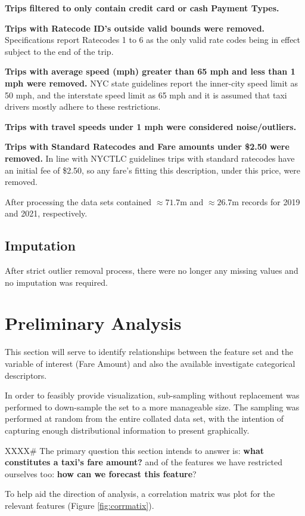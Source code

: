 \documentclass[11pt]{article}
\begin{document}
\textbf{Trips filtered to only contain credit card or cash Payment Types.}

\textbf{Trips with Ratecode ID’s outside valid bounds were removed.} Specifications report Ratecodes 1 to 6 as the only valid rate codes being in effect subject to the end of the trip.

\textbf{Trips with average speed (mph) greater than 65 mph and less than 1 mph were removed.} NYC state guidelines \cite{nyctlc_pass} report the inner-city speed limit as 50 mph, and the interstate speed limit as 65 mph and it is assumed that taxi drivers mostly adhere to these restrictions. 

\textbf{Trips with travel speeds under 1 mph were considered noise/outliers.}

\textbf{Trips with Standard Ratecodes and Fare amounts under \$2.50 were removed.} In line with NYCTLC guidelines trips with standard ratecodes have an initial fee of \$2.50, so any fare's fitting this description, under this price, were removed.

After processing the data sets contained $\approx 71.7$m and $\approx 26.7$m records for 2019 and 2021, respectively.

\subsection{Imputation}
After strict outlier removal process, there were no longer any missing values and no imputation was required.

\section{Preliminary Analysis}
This section will serve to identify relationships between the feature set and the variable of interest (Fare Amount) and also the available investigate categorical descriptors.

In order to feasibly provide visualization, sub-sampling without replacement was performed to down-sample the set to a more manageable size. The sampling was performed at random from the entire collated data set, with the intention of capturing enough distributional information to present graphically.

XXXX\#
The primary question this section intends to answer is: \textbf{what constitutes a taxi's fare amount?} and of the features we have restricted ourselves too: \textbf{how can we forecast this feature}? 

To help aid the direction of analysis, a correlation matrix was plot for the relevant features (Figure \ref{fig:corrmatix}).
\end{document}
